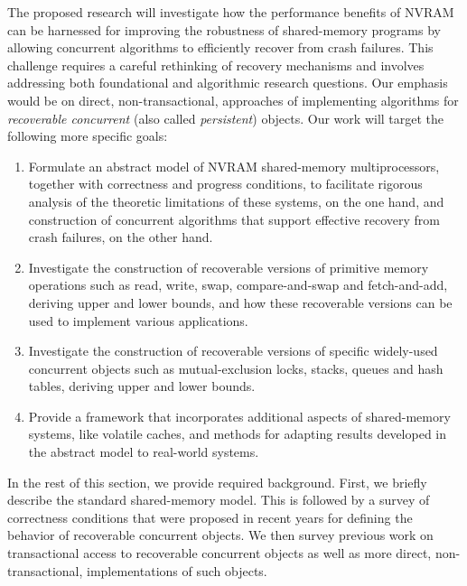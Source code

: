 The proposed research will investigate how the performance benefits of NVRAM can be harnessed
for improving the robustness of shared-memory programs by allowing concurrent algorithms to efficiently recover from crash failures. This challenge requires a careful rethinking of recovery mechanisms and involves addressing both foundational and algorithmic research questions. Our emphasis would be on direct, non-transactional, approaches of implementing algorithms for \emph{recoverable concurrent} (also called \emph{persistent}) objects.
Our work will target the following more specific goals:
\begin{enumerate}
	\item Formulate an abstract model of NVRAM shared-memory multiprocessors,
	together with correctness and progress conditions,
	to facilitate rigorous analysis of the theoretic limitations
	of these systems, on the one hand, and construction of concurrent
	algorithms that support effective recovery from crash failures, on the other hand.
	
	\item Investigate the construction of recoverable versions of primitive
	memory operations such as read, write, swap, compare-and-swap and fetch-and-add,
	deriving upper and lower bounds, and how these recoverable versions
	can be used to implement various applications.
	
	\item Investigate the construction of recoverable versions of
	specific widely-used concurrent objects such as mutual-exclusion locks,
	stacks, queues and hash tables, deriving upper and lower bounds.
	
	\item Provide a framework that incorporates additional aspects of
	shared-memory systems, like volatile caches, and methods for adapting results
	developed in the abstract model to real-world systems.
\end{enumerate}

In the rest of this section, we provide required background.
First, we briefly describe the standard shared-memory model.
This is followed by a survey of correctness conditions that
were proposed in recent years for defining the behavior
of recoverable concurrent objects.
We then survey previous work on transactional access to recoverable
concurrent objects as well as more direct, non-transactional,
implementations of such objects.